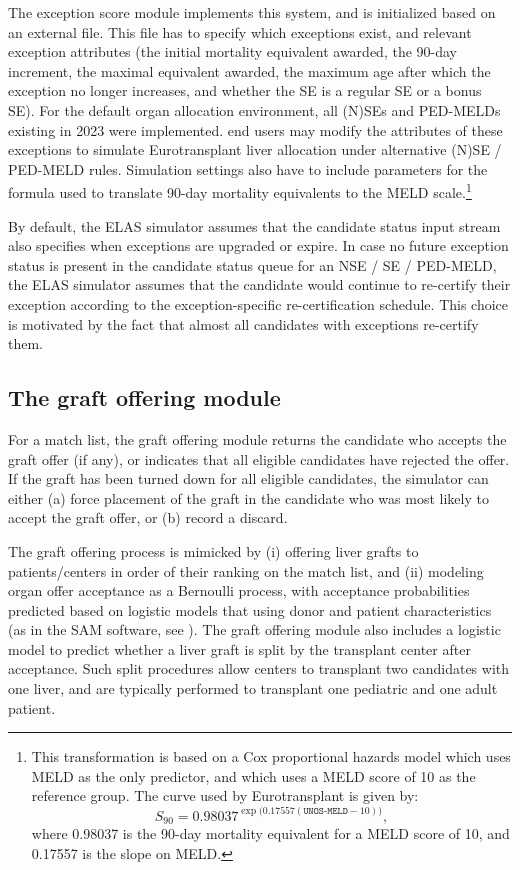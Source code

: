 \documentclass[11pt,twoside,]{book}
\let\rmarkdownfootnote\footnote%
\def\footnote{\protect\rmarkdownfootnote}
\begin{document}
The exception score module implements this system, and is initialized
based on an external file. This file has to specify which exceptions
exist, and relevant exception attributes (the initial mortality
equivalent awarded, the 90-day increment, the maximal equivalent
awarded, the maximum age after which the exception no longer increases,
and whether the SE is a regular SE or a bonus SE). For the default organ
allocation environment, all (N)SEs and PED-MELDs existing in 2023 were
implemented. end users may modify the attributes of these exceptions to
simulate Eurotransplant liver allocation under alternative (N)SE / PED-MELD rules. Simulation settings
also have to include parameters for the formula used to translate 90-day
mortality equivalents to the MELD scale.\footnote{This transformation is based on a Cox
  proportional hazards model which uses MELD as the only predictor,
  and which uses a MELD score of 10 as the reference group. The curve used by Eurotransplant is given by: \[S_{90} = 0.98037 ^ {\exp\Big(0.17557(\texttt{UNOS-MELD} - 10)\Big)},\] where 0.98037 is the 90-day mortality equivalent for a MELD score of 10, and 0.17557 is the slope on MELD.}

By default, the ELAS simulator assumes that the candidate status input
stream also specifies when exceptions are upgraded or expire. In case no
future exception status is present in the candidate status queue for an
NSE / SE / PED-MELD, the ELAS simulator assumes that the candidate would
continue to re-certify their exception according to the
exception-specific re-certification schedule. This choice is motivated
by the fact that almost all candidates with exceptions re-certify them.

\subsection{The graft offering module}\label{sec:elasacceptance}

For a match list, the graft offering module returns the candidate who accepts the graft offer (if any), or indicates that all eligible candidates have rejected the offer. If the graft has been turned down for all eligible candidates, the simulator can either (a) force placement of the graft in
the candidate who was most likely to accept the graft offer, or (b)
record a discard.

The graft offering process is mimicked by (i) offering liver grafts to
patients/centers in order of their ranking on the match list, and (ii)
modeling organ offer acceptance as a Bernoulli process, with
acceptance probabilities predicted based on logistic models that using
donor and patient characteristics (as in the SAM software, see \citep{SRTR2019}).
The graft offering module also includes a logistic model to predict whether a
liver graft is split by the transplant center after acceptance.
Such split procedures allow centers to transplant two
candidates with one liver, and are typically performed to transplant one
pediatric and one adult patient.
\end{document}
